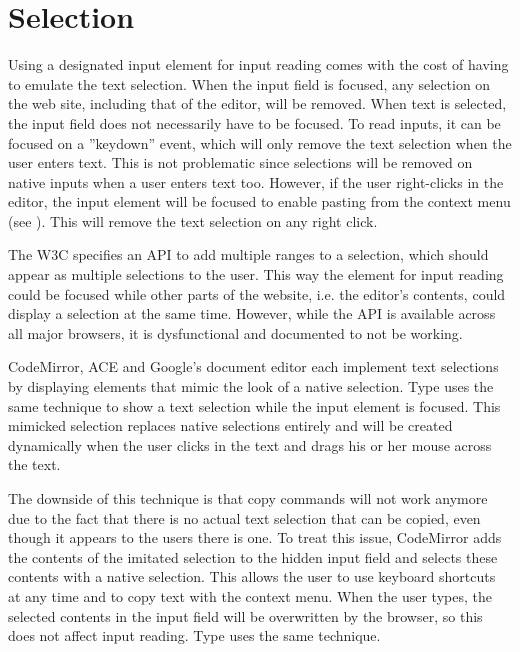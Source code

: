 \section{Selection}

Using a designated input element for input reading comes with the cost of having to emulate the text selection. When the input field is focused, any selection on the web site, including that of the editor, will be removed. When text is selected, the input field does not necessarily have to be focused. To read inputs, it can be focused on a ''keydown'' event, which will only remove the text selection when the user enters text. This is not problematic since selections will be removed on native inputs when a user enters text too. However, if the user right-clicks in the editor, the input element will be focused to enable pasting from the context menu (see ). This will remove the text selection on any right click.

The W3C specifies an API to add multiple ranges to a selection, which should appear as multiple selections to the user. This way the element for input reading could be focused while other parts of the website, i.e. the editor's contents, could display a selection at the same time. However, while the API is available across all major browsers, it is dysfunctional and documented to not be working.

CodeMirror, ACE and Google's document editor each implement text selections by displaying  elements that mimic the look of a native selection. Type uses the same technique to show a text selection while the input element is focused. This mimicked selection replaces native selections entirely and will be created dynamically when the user clicks in the text and drags his or her mouse across the text.

The downside of this technique is that copy commands will not work anymore due to the fact that there is no actual text selection that can be copied, even though it appears to the users there is one. To treat this issue, CodeMirror adds the contents of the imitated selection to the hidden input field and selects these contents with a native selection. This allows the user to use keyboard shortcuts at any time and to copy text with the context menu. When the user types, the selected contents in the input field will be overwritten by the browser, so this does not affect input reading. Type uses the same technique.

